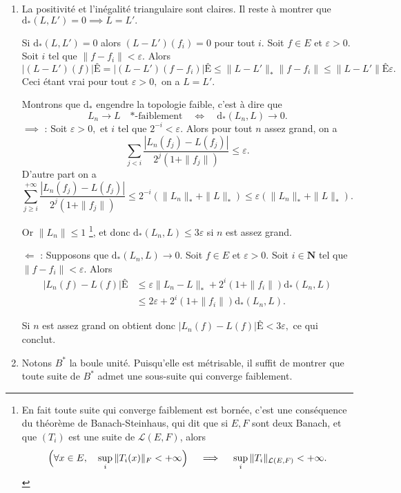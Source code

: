 \documentclass[a4paper,12pt,openany]{article}
\theoremstyle{plain}
\theoremstyle{definition}
\newcommand{\dd}{\mathrm{d}}
\newcommand{\N}{\mathbf{N}}
\newcommand{\Lcal}{\mathcal{L}}
\begin{document}
\begin{enumerate}
\item La positivit\'e et l'in\'egalit\'e triangulaire sont claires. Il reste \`a montrer que $\dd_*(L,L') = 0 \implies L = L'.$



Si $\dd_*(L,L') = 0$ alors $(L-L')(f_i) = 0$ pour tout $i$. Soit $f \in E$ et $\varepsilon > 0.$ Soit $i$ tel que $\|f - f_i\| < \varepsilon$.  Alors
$$
\left|(L-L')(f)\right|Ê= \left|(L-L')(f-f_i)\right|Ê\leqslant \|L-L'\|_* \|f-f_i\| \leqslant \|L-L'\|Ê\varepsilon.
$$
Ceci \'etant vrai pour tout $\varepsilon > 0,$ on a $L = L'$.
 

Montrons que $\dd_*$ engendre la topologie faible, c'est \`a dire que 
$$
L_n \to L \quad \text{$*$-faiblement} \quad \iff \quad \dd_*(L_n, L) \to 0.
$$
\underline{$\implies$} : Soit $\varepsilon > 0,$ et $i$ tel que $2^{-i} < \varepsilon$. Alors pour tout $n$ assez grand, on a 
$$
\sum_{j<i} \frac{\left|L_n(f_j) - L(f_j)\right|}{2^j (1 + \|f_j\|)} \leqslant \varepsilon.
$$
D'autre part on a 
$$
\sum_{j \geqslant i}^{+\infty} \frac{\left|L_n(f_j) - L(f_j)\right|}{2^j (1 + \|f_j\|)} \leqslant 2^{-i}(\|L_n\|_* + \|L\|_*) \leqslant \varepsilon (\|L_n\|_* + \|L\|_*).
$$

Or $\|L_n\| \leqslant 1$ \footnote{En fait toute suite qui converge faiblement est born\'ee, c'est une cons\'equence du th\'eor\`eme de Banach-Steinhaus, qui dit que si $E,F$ sont deux Banach, et que $(T_i)$ est une suite de $\Lcal(E,F)$, alors
$$
\Bigl(\forall x \in E, \quad \sup_i \|T_i(x)\|_F < +\infty \Bigr) \quad \implies \quad \sup_i \|T_i\|_{\Lcal(E,F)} < +\infty.
$$
},  et donc $\dd_*(L_n, L) \leqslant 3 \varepsilon$ si $n$ est assez grand.



\underline{$\Longleftarrow$} : Supposons que $\dd_*(L_n, L) \to 0$. Soit $f \in E$ et $\varepsilon > 0$. Soit $i \in \N$ tel que $\|f-f_i\| < \varepsilon.$  Alors 
$$
\begin{aligned}
|L_n(f) - L(f)|Ê&\leqslant \varepsilon \|L_n - L\|_* + 2^i (1 + \|f_i\|) \dd_*(L_n,L)  \\
& \leqslant 2\varepsilon + 2^i(1 + \|f_i\|) \dd_*(L_n,L).
\end{aligned}
$$

Si $n$ est assez grand on obtient donc $|L_n(f) - L(f)|Ê< 3\varepsilon,$ ce qui conclut.


\item Notons $B^*$ la boule unit\'e. Puisqu'elle est m\'etrisable, il suffit de montrer que toute suite de $B^*$ admet une sous-suite qui converge faiblement.




\end{enumerate}
\end{document}
